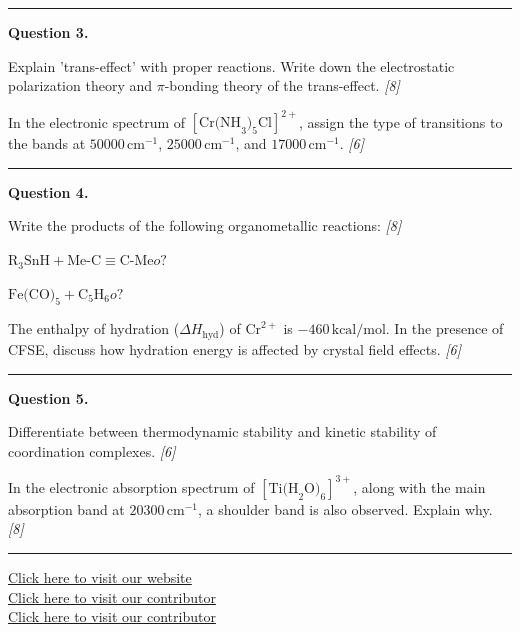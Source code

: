 \documentclass[11pt,a4paper]{article}
\newcommand{\pts}[1]{\hfill   \textit{[#1]}}
\begin{document}
\medskip\rule{\linewidth}{0.2pt}




\noindent   \textbf{Question 3.}

\begin{parts}
  \item Explain 'trans-effect' with proper reactions. Write down the electrostatic polarization theory and $\pi$-bonding theory of the trans-effect. \pts{8}
  \item In the electronic spectrum of $[ \text{Cr(NH}_3)_5 \text{Cl}]^{2+}$, assign the type of transitions to the bands at $50000\, \text{cm}^{-1}$, $25000\, \text{cm}^{-1}$, and $17000\, \text{cm}^{-1}$. \pts{6}
\end{parts}

\medskip\rule{\linewidth}{0.2pt}




\noindent   \textbf{Question 4.}

\begin{parts}
  \item Write the products of the following organometallic reactions: \pts{8}
  
\begin{parts}
    \item $ \text{R}_3 \text{SnH} +  \text{Me-C}\equiv \text{C-Me}  o ?$
    \item $ \text{Fe(CO)}_5 +  \text{C}_5 \text{H}_6  o ?$
  \end{parts}
  \item The enthalpy of hydration ($\Delta H_{ \text{hyd}}$) of $ \text{Cr}^{2+}$ is $-460\, \text{kcal/mol}$. In the presence of CFSE, discuss how hydration energy is affected by crystal field effects. \pts{6}
\end{parts}

\medskip\rule{\linewidth}{0.2pt}




\noindent   \textbf{Question 5.}

\begin{parts}
  \item Differentiate between thermodynamic stability and kinetic stability of coordination complexes. \pts{6}
  \item In the electronic absorption spectrum of $[ \text{Ti(H}_2 \text{O)}_6]^{3+}$, along with the main absorption band at $20300\, \text{cm}^{-1}$, a shoulder band is also observed. Explain why. \pts{8}
\end{parts}

\vfill
\rule{\linewidth}{0.4pt}

\begin{center}\small
  \href{https://bhu-exam.vercel.app/}{Click here to visit our website}\\[4pt]
  \href{https://me-aryan.vercel.app/}{Click here to visit our contributor}\\[4pt]
  \href{https://quashan-me.vercel.app/}{Click here to visit our contributor}
\end{center}
\end{document}
